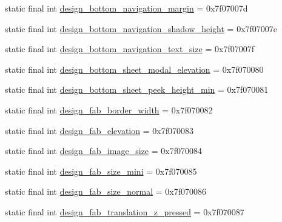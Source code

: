 \begin{CompactItemize}
\item 
static final int \hyperlink{classandroid_1_1support_1_1graphics_1_1drawable_1_1animated_1_1_r_1_1dimen_ea2b99cdde09e2d166085cc7b403da06}{design\_\-bottom\_\-navigation\_\-margin} = 0x7f07007d
\item 
static final int \hyperlink{classandroid_1_1support_1_1graphics_1_1drawable_1_1animated_1_1_r_1_1dimen_172d27ff70bb24f6c52342c4c7ceb461}{design\_\-bottom\_\-navigation\_\-shadow\_\-height} = 0x7f07007e
\item 
static final int \hyperlink{classandroid_1_1support_1_1graphics_1_1drawable_1_1animated_1_1_r_1_1dimen_9766722fbb636e304f8961a5aaf13ea8}{design\_\-bottom\_\-navigation\_\-text\_\-size} = 0x7f07007f
\item 
static final int \hyperlink{classandroid_1_1support_1_1graphics_1_1drawable_1_1animated_1_1_r_1_1dimen_3faf19e5c2437c074b3775b94ef16ad7}{design\_\-bottom\_\-sheet\_\-modal\_\-elevation} = 0x7f070080
\item 
static final int \hyperlink{classandroid_1_1support_1_1graphics_1_1drawable_1_1animated_1_1_r_1_1dimen_3247c71c4be9fe1101494ca899dcdfe2}{design\_\-bottom\_\-sheet\_\-peek\_\-height\_\-min} = 0x7f070081
\item 
static final int \hyperlink{classandroid_1_1support_1_1graphics_1_1drawable_1_1animated_1_1_r_1_1dimen_3b4344ae3d830170816919df65d15b9e}{design\_\-fab\_\-border\_\-width} = 0x7f070082
\item 
static final int \hyperlink{classandroid_1_1support_1_1graphics_1_1drawable_1_1animated_1_1_r_1_1dimen_05f9a84bd0d5847e01e8d07d3c59ce12}{design\_\-fab\_\-elevation} = 0x7f070083
\item 
static final int \hyperlink{classandroid_1_1support_1_1graphics_1_1drawable_1_1animated_1_1_r_1_1dimen_650a60eabf3516e492a07e580b8626b3}{design\_\-fab\_\-image\_\-size} = 0x7f070084
\item 
static final int \hyperlink{classandroid_1_1support_1_1graphics_1_1drawable_1_1animated_1_1_r_1_1dimen_832343a7d2391047f62ab82b4668a9f4}{design\_\-fab\_\-size\_\-mini} = 0x7f070085
\item 
static final int \hyperlink{classandroid_1_1support_1_1graphics_1_1drawable_1_1animated_1_1_r_1_1dimen_1838840ba94844d0e6b4f41b5ac4f8d7}{design\_\-fab\_\-size\_\-normal} = 0x7f070086
\item 
static final int \hyperlink{classandroid_1_1support_1_1graphics_1_1drawable_1_1animated_1_1_r_1_1dimen_b78244eb55b39e74c929b251ebc182da}{design\_\-fab\_\-translation\_\-z\_\-pressed} = 0x7f070087

\end{CompactItemize}
